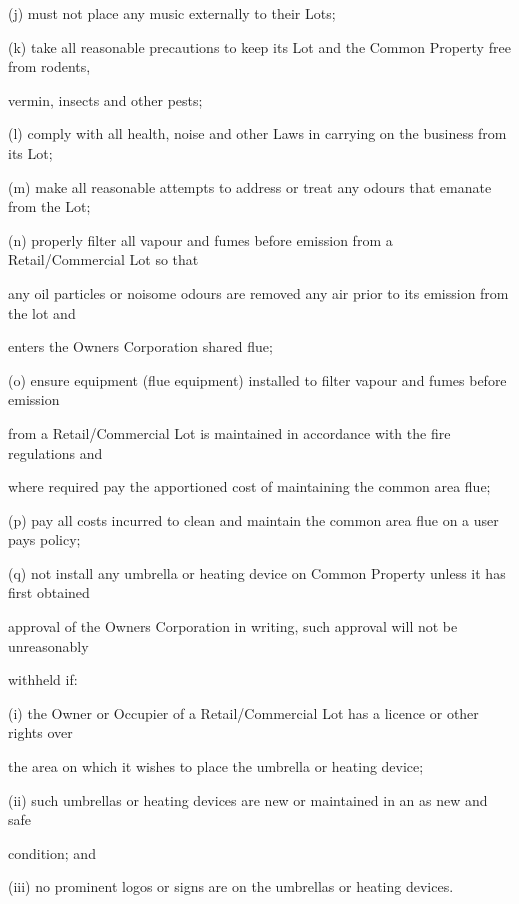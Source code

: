 \documentclass{article}
\begin{document}
{\fontsize{9.962}{1}(j) must not place any music externally to their Lots; }

{\fontsize{9.962}{1}(k) take all reasonable precautions to keep its Lot and the Common Property free from rodents, }

{\fontsize{10.02}{1}vermin, insects and other pests; }

{\fontsize{9.962}{1}(l) comply with all health, noise and other Laws in carrying on the business from its Lot; }

{\fontsize{9.962}{1}(m) make all reasonable attempts to address or treat any odours that emanate from the Lot; }

{\fontsize{9.962}{1}(n) properly filter all vapour and fumes before emission from a Retail/Commercial Lot so that }

{\fontsize{10.02}{1}any oil particles or noisome odours are removed any air prior to its emission from the lot and }

{\fontsize{10.02}{1}enters the Owners Corporation shared flue; }

{\fontsize{9.962}{1}(o) ensure equipment (flue equipment) installed to filter vapour and fumes before emission }

{\fontsize{10.02}{1}from a Retail/Commercial Lot is maintained in accordance with the fire regulations and }

{\fontsize{10.02}{1}where required pay the apportioned cost of maintaining the common area flue; }

{\fontsize{9.962}{1}(p) pay all costs incurred to clean and maintain the common area flue on a user pays policy; }

{\fontsize{9.962}{1}(q) not install any umbrella or heating device on Common Property unless it has first obtained }

{\fontsize{10.02}{1}approval of the Owners Corporation in writing, such approval will not be unreasonably }

{\fontsize{10.02}{1}withheld if: }

{\fontsize{9.962}{1}(i) the Owner or Occupier of a Retail/Commercial Lot has a licence or other rights over }

{\fontsize{10.02}{1}the area on which it wishes to place the umbrella or heating device; }

{\fontsize{9.962}{1}(ii) such umbrellas or heating devices are new or maintained in an as new and safe }

{\fontsize{10.02}{1}condition; and }

{\fontsize{9.962}{1}(iii) no prominent logos or signs are on the umbrellas or heating devices. }
\end{document}
